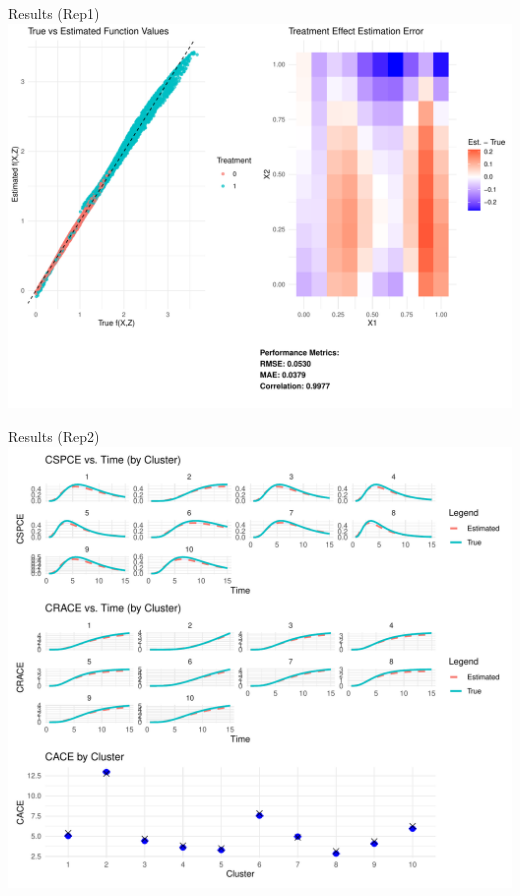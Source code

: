 \begin{frame}{Results (Rep1)}
  \includegraphics[height=.8\linewidth]{pics/Sim4_2.pdf}
\end{frame}

\begin{frame}{Results (Rep2)}
    \includegraphics[height=.8\linewidth]{pics/Sim4_rep2.pdf}
\end{frame}


